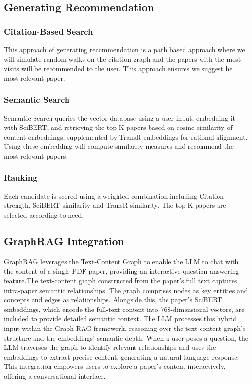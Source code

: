 \documentclass[a4paper,12pt]{article}
\begin{document}
\subsection{Generating Recommendation}
\subsubsection{Citation-Based Search}
This approach of generating recommendation is a path based approach where we will
simulate random walks on the citation graph and the papers with the most visits will
be recommended to the user. This approach ensures we suggest he most relevant paper.

\subsubsection{Semantic Search}
Semantic Search queries the vector database using a user input, embedding it with
SciBERT, and retrieving the top K papers based on cosine similarity of content
embeddings, supplemented by TransR embeddings for rational alignment. Using these
embedding will compute similarity measures and recommend the most relevant papers.

\subsubsection{Ranking}
Each candidate is scored using a weighted combination including Citation strength,
SciBERT similarity and TransR similarity. The top K papers are selected according
to need.

\subsection{GraphRAG Integration}
GraphRAG leverages the Text-Content Graph to enable the LLM to chat with the content
of a single PDF paper, providing an interactive question-answering feature.The
text-content graph constructed from the paper’s full text captures intra-paper
semantic relationships. The graph comprises nodes as key entities and concepts
and edges as relationships. Alongside this, the paper’s SciBERT embeddings, which
encode the full-text content into 768-dimensional vectors, are included to provide
detailed semantic context. The LLM processes this hybrid input within the Graph RAG
framework, reasoning over the text-content graph’s structure and the embeddings’
semantic depth. When a user poses a question, the LLM traverses the graph to identify
relevant relationships and uses the embeddings to extract precise content, generating
a natural language response. This integration empowers users to explore a paper’s
content interactively, offering a conversational interface.
\newpage
\end{document}
